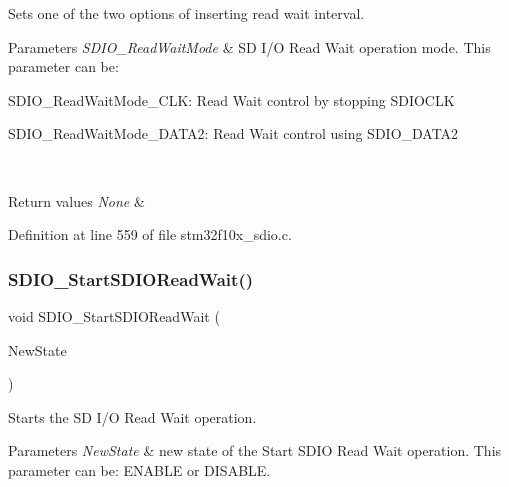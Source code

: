 Sets one of the two options of inserting read wait interval. 


\begin{DoxyParams}{Parameters}
{\em S\+D\+I\+O\+\_\+\+Read\+Wait\+Mode} & SD I/O Read Wait operation mode. This parameter can be\+: \begin{DoxyItemize}
\item S\+D\+I\+O\+\_\+\+Read\+Wait\+Mode\+\_\+\+C\+LK\+: Read Wait control by stopping S\+D\+I\+O\+C\+LK \item S\+D\+I\+O\+\_\+\+Read\+Wait\+Mode\+\_\+\+D\+A\+T\+A2\+: Read Wait control using S\+D\+I\+O\+\_\+\+D\+A\+T\+A2 \end{DoxyItemize}
\\
\hline
\end{DoxyParams}

\begin{DoxyRetVals}{Return values}
{\em None} & \\
\hline
\end{DoxyRetVals}


Definition at line 559 of file stm32f10x\+\_\+sdio.\+c.

\mbox{\label{group___s_d_i_o___private___functions_gac88f914d9a68a83abc2265ec8a7b79fc}} 
\subsubsection{\texorpdfstring{S\+D\+I\+O\+\_\+\+Start\+S\+D\+I\+O\+Read\+Wait()}{SDIO\_StartSDIOReadWait()}}
{\footnotesize\ttfamily void S\+D\+I\+O\+\_\+\+Start\+S\+D\+I\+O\+Read\+Wait (\begin{DoxyParamCaption}\item[{\hyperlink{group___exported__types_gac9a7e9a35d2513ec15c3b537aaa4fba1}{Functional\+State}}]{New\+State }\end{DoxyParamCaption})}



Starts the SD I/O Read Wait operation. 


\begin{DoxyParams}{Parameters}
{\em New\+State} & new state of the Start S\+D\+IO Read Wait operation. This parameter can be\+: E\+N\+A\+B\+LE or D\+I\+S\+A\+B\+LE. \\
\hline
\end{DoxyParams}

